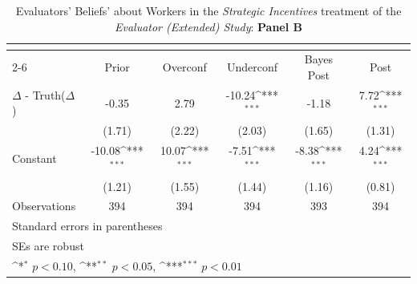 \begin{table}[htbp]\centering
\def\sym#1{\ifmmode^{#1}\else\(^{#1}\)\fi}
\caption{Evaluators' Beliefs' about Workers in the \textit{Strategic Incentives} treatment of the \textit{Evaluator (Extended) Study}: \textbf{Panel B}}
\begin{tabular}{l*{5}{c}}
\hline\hline
                &\multicolumn{5}{c}{}                                                                          \\\cmidrule(lr){2-6}
                &\multicolumn{1}{c}{Prior}&\multicolumn{1}{c}{Overconf}&\multicolumn{1}{c}{Underconf}&\multicolumn{1}{c}{Bayes Post}&\multicolumn{1}{c}{Post}\\
\hline
$\Delta$ - Truth($\Delta$)&    -0.35         &     2.79         &   -10.24\sym{***}&    -1.18         &     7.72\sym{***}\\
                &   (1.71)         &   (2.22)         &   (2.03)         &   (1.65)         &   (1.31)         \\
Constant        &   -10.08\sym{***}&    10.07\sym{***}&    -7.51\sym{***}&    -8.38\sym{***}&     4.24\sym{***}\\
                &   (1.21)         &   (1.55)         &   (1.44)         &   (1.16)         &   (0.81)         \\
\hline
Observations    &      394         &      394         &      394         &      393         &      394         \\
\hline\hline
\multicolumn{6}{l}{\footnotesize Standard errors in parentheses}\\
\multicolumn{6}{l}{\footnotesize SEs are robust}\\
\multicolumn{6}{l}{\footnotesize \sym{*} \(p<0.10\), \sym{**} \(p<0.05\), \sym{***} \(p<0.01\)}\\
\end{tabular}
\end{table}
